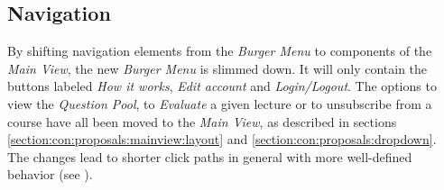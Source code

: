 \subsection{Navigation}
By shifting navigation elements from the \emph{Burger Menu} to components of the \emph{Main View}, the new \emph{Burger Menu} is slimmed down.
It will only contain the buttons labeled \emph{How it works}, \emph{Edit account} and \emph{Login/Logout}. The options to view the \emph{Question Pool}, to \emph{Evaluate} a given lecture or to unsubscribe from a course have all been moved to the \emph{Main View}, as described in sections \autoref{section:con:proposals:mainview:layout} and \autoref{section:con:proposals:dropdown}.
The changes lead to shorter click paths in general with more well-defined behavior (see \todogrf).


